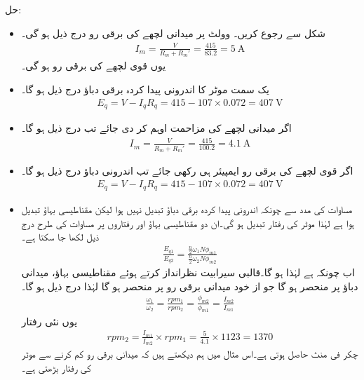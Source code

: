 حل:
\begin{itemize}
\item
شکل   سے رجوع کریں۔ وولٹ پر میدانی لچھے کی برقی رو درج ذیل ہو گی۔
\begin{align*}
I_m=\tfrac{V}{R_m+R_m'}=\frac{415}{83.2}= \SI{5}{\ampere}
\end{align*}
یوں قوی لچھے کی برقی رو  ہو گی۔
\item
یک سمت  موٹر کا اندرونی پیدا کردہ برقی دباؤ درج ذیل ہو گا۔
\begin{align*}
E_q=V-I_q R_q=415-107\times 0.072=\SI{407}{\volt}
\end{align*}
\item
اگر میدانی لچھے کی مزاحمت  اوہم کر دی جائے  تب  درج ذیل ہو گا۔
\begin{align*}
I_m=\frac{V}{R_m+R_m'}=\frac{415}{100.2}= \SI{4.1}{\ampere}
\end{align*}
\item
اگر قوی لچھے کی  برقی رو  ایمپیئر ہی رکھی جائے تب  اندرونی دباؤ درج ذیل ہو گا۔
\begin{align*}
E_q=V-I_q R_q=415-107 \times 0.072= \SI{407}{\volt}
\end{align*}
\item
مساوات   کی مدد سے  چونکہ اندرونی پیدا کردہ برقی دباؤ تبدیل نہیں ہوا لیکن مقناطیسی بہاؤ تبدیل ہوا ہے لہٰذا موٹر کی رفتار تبدیل ہو گی۔ان دو مقناطیسی بہاؤ اور رفتاروں پر مساوات  کی طرح  درج ذیل لکھا جا سکتا ہے۔
\begin{align*}
\frac{E_{q1}}{E_{q2}}=\frac{\frac{n}{2} \omega_1 N \phi_{m1}}{\frac{n}{2} \omega_2 N \phi_{m2}}
\end{align*}
اب چونکہ  ہے  لہٰذا  ہو گا۔قالبی سیرابیت  نظرانداز کرتے ہوئے مقناطیسی بہاؤ، میدانی دباؤ پر منحصر ہو گا جو از خود میدانی برقی رو پر منحصر ہو گا  لہٰذا درج ذیل ہو گا۔
\begin{align*}
\frac{\omega_1}{\omega_2}=\frac{rpm_1}{rpm_2}=\frac{\phi_{m2}}{\phi_{m1}}=\frac{I_{m2}}{I_{m1}}
\end{align*}
یوں  نئی رفتار
\begin{align*}
rpm_2=\frac{I_{m1}}{I_{m2}} \times rpm_1=\frac{5}{4.1} \times 1123= 1370
\end{align*}
چکر فی منٹ حاصل ہوتی ہے۔اس مثال میں ہم دیکھتے ہیں کہ میدانی برقی رو کم کرنے سے موٹر کی رفتار بڑھتی ہے۔
\end{itemize}
